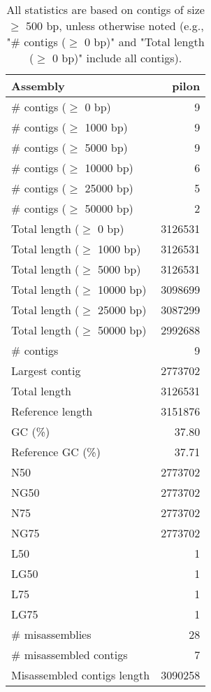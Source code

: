 \documentclass[12pt,a4paper]{article}
\begin{document}
\begin{table}[ht]
\begin{center}
\caption{All statistics are based on contigs of size $\geq$ 500 bp, unless otherwise noted (e.g., "\# contigs ($\geq$ 0 bp)" and "Total length ($\geq$ 0 bp)" include all contigs).}
\begin{tabular}{|l*{1}{|r}|}
\hline
Assembly & pilon \\ \hline
\# contigs ($\geq$ 0 bp) & 9 \\ \hline
\# contigs ($\geq$ 1000 bp) & 9 \\ \hline
\# contigs ($\geq$ 5000 bp) & 9 \\ \hline
\# contigs ($\geq$ 10000 bp) & 6 \\ \hline
\# contigs ($\geq$ 25000 bp) & 5 \\ \hline
\# contigs ($\geq$ 50000 bp) & 2 \\ \hline
Total length ($\geq$ 0 bp) & 3126531 \\ \hline
Total length ($\geq$ 1000 bp) & 3126531 \\ \hline
Total length ($\geq$ 5000 bp) & 3126531 \\ \hline
Total length ($\geq$ 10000 bp) & 3098699 \\ \hline
Total length ($\geq$ 25000 bp) & 3087299 \\ \hline
Total length ($\geq$ 50000 bp) & 2992688 \\ \hline
\# contigs & 9 \\ \hline
Largest contig & 2773702 \\ \hline
Total length & 3126531 \\ \hline
Reference length & 3151876 \\ \hline
GC (\%) & 37.80 \\ \hline
Reference GC (\%) & 37.71 \\ \hline
N50 & 2773702 \\ \hline
NG50 & 2773702 \\ \hline
N75 & 2773702 \\ \hline
NG75 & 2773702 \\ \hline
L50 & 1 \\ \hline
LG50 & 1 \\ \hline
L75 & 1 \\ \hline
LG75 & 1 \\ \hline
\# misassemblies & 28 \\ \hline
\# misassembled contigs & 7 \\ \hline
Misassembled contigs length & 3090258 \\ \hline

\end{tabular}
\end{center}
\end{table}
\end{document}
